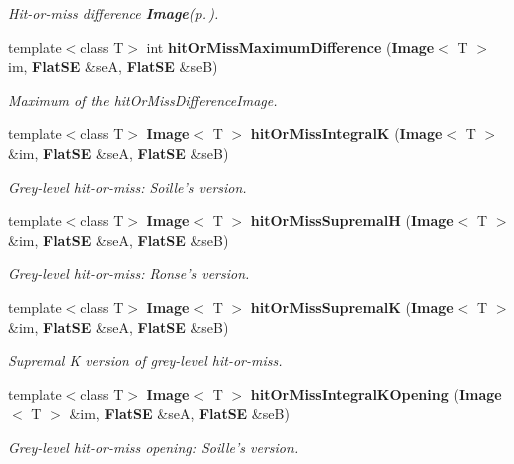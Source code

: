 \begin{CompactItemize}
\begin{CompactList}\small\item\em Hit-or-miss difference {\bf Image}{\rm (p.\,\pageref{classLibTIM_1_1Image})}. \item\end{CompactList}\item 
template$<$class T$>$ int {\bf hit\-Or\-Miss\-Maximum\-Difference} ({\bf Image}$<$ T $>$ im, {\bf Flat\-SE} \&se\-A, {\bf Flat\-SE} \&se\-B)
\begin{CompactList}\small\item\em Maximum of the hit\-Or\-Miss\-Difference\-Image. \item\end{CompactList}\item 
template$<$class T$>$ {\bf Image}$<$ T $>$ {\bf hit\-Or\-Miss\-Integral\-K} ({\bf Image}$<$ T $>$ \&im, {\bf Flat\-SE} \&se\-A, {\bf Flat\-SE} \&se\-B)
\begin{CompactList}\small\item\em Grey-level hit-or-miss: Soille's version. \item\end{CompactList}\item 
template$<$class T$>$ {\bf Image}$<$ T $>$ {\bf hit\-Or\-Miss\-Supremal\-H} ({\bf Image}$<$ T $>$ \&im, {\bf Flat\-SE} \&se\-A, {\bf Flat\-SE} \&se\-B)
\begin{CompactList}\small\item\em Grey-level hit-or-miss: Ronse's version. \item\end{CompactList}\item 
template$<$class T$>$ {\bf Image}$<$ T $>$ {\bf hit\-Or\-Miss\-Supremal\-K} ({\bf Image}$<$ T $>$ \&im, {\bf Flat\-SE} \&se\-A, {\bf Flat\-SE} \&se\-B)
\begin{CompactList}\small\item\em Supremal K version of grey-level hit-or-miss. \item\end{CompactList}\item 
template$<$class T$>$ {\bf Image}$<$ T $>$ {\bf hit\-Or\-Miss\-Integral\-KOpening} ({\bf Image}$<$ T $>$ \&im, {\bf Flat\-SE} \&se\-A, {\bf Flat\-SE} \&se\-B)
\begin{CompactList}\small\item\em Grey-level hit-or-miss opening: Soille's version. \item\end{CompactList}\item 

\end{CompactItemize}
